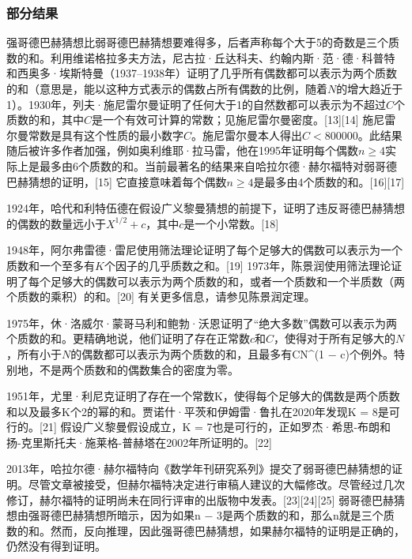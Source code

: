 \subsubsection{部分结果}  
强哥德巴赫猜想比弱哥德巴赫猜想要难得多，后者声称每个大于5的奇数是三个质数的和。利用维诺格拉多夫方法，尼古拉·丘达科夫、约翰内斯·范·德·科普特和西奥多·埃斯特曼（1937–1938年）证明了几乎所有偶数都可以表示为两个质数的和（意思是，能以这种方式表示的偶数占所有偶数的比例，随着\(N\)的增大趋近于1）。1930年，列夫·施尼雷尔曼证明了任何大于1的自然数都可以表示为不超过\(C\)个质数的和，其中\(C\)是一个有效可计算的常数；见施尼雷尔曼密度。[13][14] 施尼雷尔曼常数是具有这个性质的最小数字\(C\)。施尼雷尔曼本人得出\(C < 800000\)。此结果随后被许多作者加强，例如奥利维耶·拉马雷，他在1995年证明每个偶数\(n\ge4\)实际上是最多由6个质数的和。当前最著名的结果来自哈拉尔德·赫尔福特对弱哥德巴赫猜想的证明，[15] 它直接意味着每个偶数\(n\ge4\)是最多由4个质数的和。[16][17]

1924年，哈代和利特伍德在假设广义黎曼猜想的前提下，证明了违反哥德巴赫猜想的偶数的数量远小于\(X^{1/2}+ c\)，其中\(c\)是一个小常数。[18]

1948年，阿尔弗雷德·雷尼使用筛法理论证明了每个足够大的偶数可以表示为一个质数和一个至多有\(K\)个因子的几乎质数之和。[19] 1973年，陈景润使用筛法理论证明了每个足够大的偶数可以表示为两个质数的和，或者一个质数和一个半质数（两个质数的乘积）的和。[20] 有关更多信息，请参见陈景润定理。

1975年，休·洛威尔·蒙哥马利和鲍勃·沃恩证明了“绝大多数”偶数可以表示为两个质数的和。更精确地说，他们证明了存在正常数\(c\)和\(C\)，使得对于所有足够大的\(N\)，所有小于\(N\)的偶数都可以表示为两个质数的和，且最多有CN^(1 − c)个例外。特别地，不是两个质数和的偶数集合的密度为零。

1951年，尤里·利尼克证明了存在一个常数K，使得每个足够大的偶数是两个质数和以及最多K个2的幂的和。贾诺什·平茨和伊姆雷·鲁扎在2020年发现K = 8是可行的。[21] 假设广义黎曼假设成立，K = 7也是可行的，正如罗杰·希思-布朗和扬-克里斯托夫·施莱格-普赫塔在2002年所证明的。[22]

2013年，哈拉尔德·赫尔福特向《数学年刊研究系列》提交了弱哥德巴赫猜想的证明。尽管文章被接受，但赫尔福特决定进行审稿人建议的大幅修改。尽管经过几次修订，赫尔福特的证明尚未在同行评审的出版物中发表。[23][24][25] 弱哥德巴赫猜想由强哥德巴赫猜想所暗示，因为如果n − 3是两个质数的和，那么n就是三个质数的和。然而，反向推理，因此强哥德巴赫猜想，如果赫尔福特的证明是正确的，仍然没有得到证明。